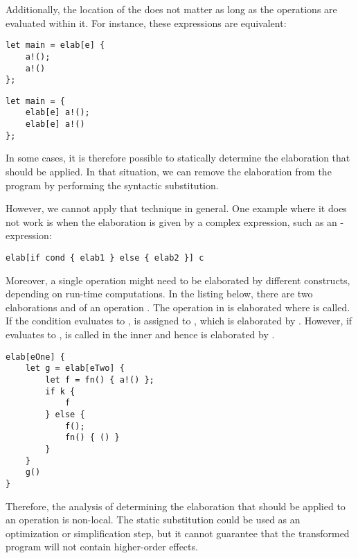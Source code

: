Additionally, the location of the  does not matter as long as the operations are evaluated within it. For instance, these expressions are equivalent:

\begin{minipage}[b]{0.5\textwidth}
\begin{lstlisting}[language=elaine,style=fancy]
let main = elab[e] {
    a!();
    a!()
};
\end{lstlisting}
\end{minipage}
\begin{minipage}[b]{0.5\textwidth}
\begin{lstlisting}[language=elaine,style=fancy]
let main = {
    elab[e] a!();
    elab[e] a!()
};
\end{lstlisting}
\end{minipage}

In some cases, it is therefore possible to statically determine the elaboration that should be applied. In that situation, we can remove the elaboration from the program by performing the syntactic substitution.

However, we cannot apply that technique in general. One example where it does not work is when the elaboration is given by a complex expression, such as an -expression:
\begin{lstlisting}[language=elaine,style=fancy]
elab[if cond { elab1 } else { elab2 }] c
\end{lstlisting}

Moreover, a single operation might need to be elaborated by different  constructs, depending on run-time computations. In the listing below, there are two elaborations  and  of an operation . The  operation in  is elaborated where  is called. If the condition  evaluates to ,  is assigned to , which is elaborated by . However, if  evaluates to ,  is called in the inner  and hence  is elaborated by .

\begin{lstlisting}[language=elaine,style=fancy]
elab[eOne] {
    let g = elab[eTwo] {
        let f = fn() { a!() };
        if k {
            f
        } else {
            f();
            fn() { () }
        }
    }
    g()
}
\end{lstlisting}

Therefore, the analysis of determining the elaboration that should be applied to an operation is non-local. The static substitution could be used as an optimization or simplification step, but it cannot guarantee that the transformed program will not contain higher-order effects.

